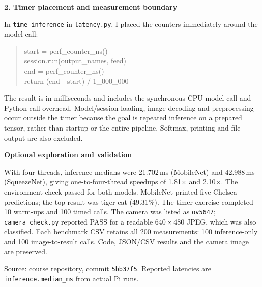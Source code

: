 \documentclass[11pt,letterpaper]{article}
\newcommand{\topic}[1]{\par\smallskip\textbf{#1}\par\nopagebreak}
\begin{document}
\topic{2. Timer placement and measurement boundary}
In \texttt{time\_inference} in \texttt{latency.py}, I placed the counters immediately around the model call:
\begin{quote}\small\ttfamily
start = perf\_counter\_ns()\\
session.run(output\_names, feed)\\
end = perf\_counter\_ns()\\
return (end - start) / 1\_000\_000
\end{quote}
The result is in milliseconds and includes the synchronous CPU model call and Python call overhead. Model/session loading, image decoding and preprocessing occur outside the timer because the goal is repeated inference on a prepared tensor, rather than startup or the entire pipeline. Softmax, printing and file output are also excluded.

\topic{Optional exploration and validation}
With four threads, inference medians were 21.702\,ms (MobileNet) and 42.988\,ms (SqueezeNet), giving one-to-four-thread speedups of 1.81$\times$ and 2.10$\times$. The environment check passed for both models. MobileNet printed five Chelsea predictions; the top result was tiger cat (49.31\%). The timer exercise completed 10 warm-ups and 100 timed calls. The camera was listed as \texttt{ov5647}; \texttt{camera\_check.py} reported PASS for a readable $640\times480$ JPEG, which was also classified. Each benchmark CSV retains all 200 measurements: 100 inference-only and 100 image-to-result calls. Code, JSON/CSV results and the camera image are preserved.

\vfill
{\small Source: \href{https://github.com/guoyb17/CSE60685-FA26-Lab-1/tree/5bb37f5c8718881a9728e3cc7567a560b4119920}{course repository, commit \texttt{5bb37f5}}. Reported latencies are \texttt{inference.median\_ms} from actual Pi runs.}
\end{document}
